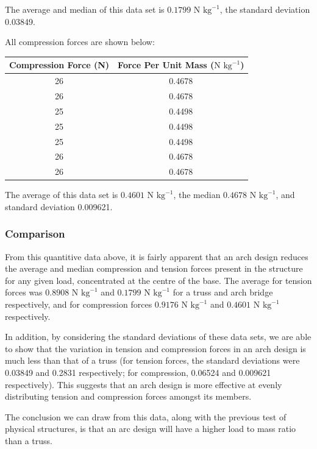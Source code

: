 \documentclass[a4paper,11pt]{article}
\begin{document}
The average and median of this data set is $0.1799\mbox{ N kg}^{-1}$, the
standard deviation 0.03849.

All compression forces are shown below:

\begin{center}
\begin{tabular}{|c|c|}
\hline
Compression Force (N) & Force Per Unit Mass ($\mbox{N kg}^{-1}$) \\
\hline
26 & 0.4678 \\
26 & 0.4678 \\
25 & 0.4498 \\
25 & 0.4498 \\
25 & 0.4498 \\
26 & 0.4678 \\
26 & 0.4678 \\
\hline
\end{tabular}
\end{center}

The average of this data set is $0.4601\mbox{ N kg}^{-1}$, the median
$0.4678\mbox{ N kg}^{-1}$, and standard deviation 0.009621.


\subsubsection{Comparison}

From this quantitive data above, it is fairly apparent that an arch design
reduces the average and median compression and tension forces present in the
structure for any given load, concentrated at the centre of the base. The
average for tension forces was $0.8908\mbox{ N kg}^{-1}$ and
$0.1799\mbox{ N kg}^{-1}$ for a truss and arch bridge respectively, and for
compression forces $0.9176\mbox{ N kg}^{-1}$ and $0.4601\mbox{ N kg}^{-1}$
respectively.

In addition, by considering the standard deviations of these data sets, we are
able to show that the variation in tension and compression forces in an arch
design is much less than that of a truss (for tension forces, the standard
deviations were 0.03849 and 0.2831 respectively; for compression, 0.06524 and
0.009621 respectively).
This suggests that an arch design is more effective at evenly distributing
tension and compression forces amongst its members.

The conclusion we can draw from this data, along with the previous test of
physical structures, is that an arc design will have a higher load to mass ratio
than a truss.
\end{document}
